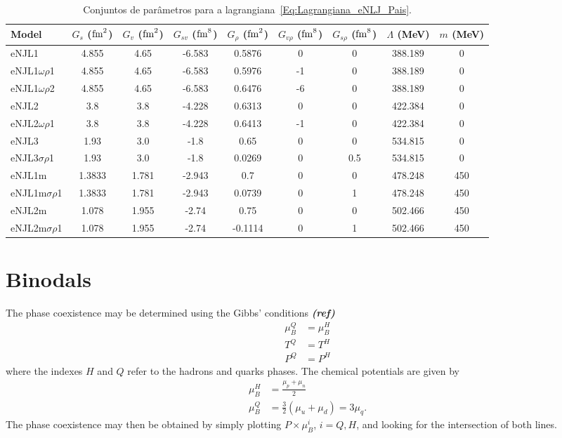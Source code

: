 \documentclass[prc, reprint, amsmath, linenumbers,10pt]{revtex4-1}
\newcommand{\comment}[1]{{\bf\textit{#1}}}
\begin{document}
\begin{table*}
\caption{Conjuntos de parâmetros para a lagrangiana~\eqref{Eq:Lagrangiana_eNLJ_Pais}\cite{Pais2016}. \label{Tab:Parametros_eNJL}}
\begin{ruledtabular}
\begin{tabular}{lcccccccc}
Model & $G_s$ ($\rm{fm}^2$) & $G_v$ ($\rm{fm}^2$) & $G_{sv}$ ($\rm{fm}^8$) & $G_\rho$ ($\rm{fm}^2$) & $G_{v\rho}$ ($\rm{fm}^8$) & $G_{s\rho}$ ($\rm{fm}^8$) & $\Lambda$ (MeV) & $m$ (MeV) \\
\hline
eNJL1 & 4.855 & 4.65 & -6.583 & 0.5876 & 0 & 0 & 388.189 & 0 \\
eNJL1$\omega\rho$1 & 4.855 & 4.65 & -6.583 & 0.5976 & -1 & 0 & 388.189 & 0 \\
eNJL1$\omega\rho$2 & 4.855 & 4.65 & -6.583 & 0.6476 & -6 & 0 & 388.189 & 0 \\
eNJL2 & 3.8 & 3.8 & -4.228 & 0.6313 & 0 & 0 & 422.384 & 0 \\
eNJL2$\omega\rho$1 & 3.8 & 3.8 & -4.228 & 0.6413 & -1 & 0 & 422.384 & 0 \\
eNJL3 & 1.93 & 3.0 & -1.8 & 0.65 & 0 & 0 & 534.815 & 0 \\
eNJL3$\sigma\rho$1 & 1.93 & 3.0 & -1.8 & 0.0269 & 0 & 0.5 & 534.815 & 0 \\
eNJL1m & 1.3833 & 1.781 & -2.943 & 0.7 & 0 & 0 & 478.248 & 450 \\
eNJL1m$\sigma\rho$1 & 1.3833 & 1.781 & -2.943 & 0.0739 & 0 & 1 & 478.248 & 450 \\
eNJL2m & 1.078 & 1.955 & -2.74 & 0.75 & 0 & 0 & 502.466 & 450 \\
eNJL2m$\sigma\rho$1 & 1.078 & 1.955 & -2.74 & -0.1114 & 0 & 1 & 502.466 & 450 \\
\end{tabular}
\end{ruledtabular}
\end{table*}

\section{Binodals}

The phase coexistence may be determined using the Gibbs' conditions \comment{(ref)}
\begin{align}
\mu_B^Q &= \mu_B^H \\
T^Q &= T^H \\
P^Q &= P^H
\end{align}
%
where the indexes $H$ and $Q$ refer to the hadrons and quarks phases. The chemical potentials are given by \cite{Cavagnoli2011}
\begin{align}
	\mu_B^H &= \frac{\mu_p + \mu_n}{2} \\
	\mu_B^Q &= \frac{3}{2} (\mu_u + \mu_d) = 3 \mu_q.
\end{align}
%
The phase coexistence may then be obtained by simply plotting $P \times \mu_B^i$, $i = Q, H$, and looking for the intersection of both lines.
\end{document}
